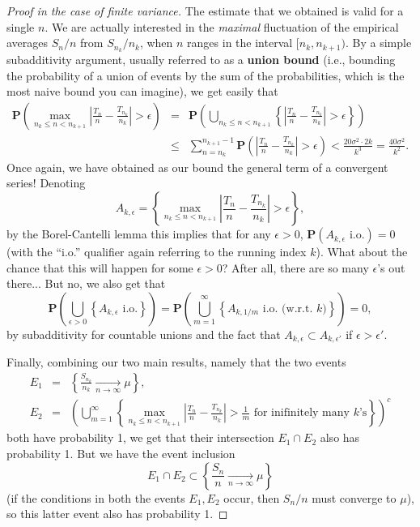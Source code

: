\documentclass[12pt]{article}
\newcommand{\prob}{\mathbf{P}}
\theoremstyle{example}
\begin{document}
\begin{proof}[Proof in the case of finite variance]
 The estimate that we obtained is valid for a single $n$. We are actually interested in the \emph{maximal} fluctuation of the empirical averages $S_n/n$ from $S_{n_k}/n_k$, when $n$ ranges in the interval $[n_k,n_{k+1})$. By a simple subadditivity argument, usually referred to as a \textbf{union bound} (i.e., bounding the probability of a union of events by the sum of the probabilities, which is the most naive bound you can imagine), we get easily that
\begin{eqnarray*}
 \prob\left(\max_{n_k \le n < n_{k+1}} \left| \frac{T_n}{n} - \frac{T_{n_k}}{n_k} \right| > \epsilon \right)
 &=& 
 \prob\left(\bigcup_{n_k \le n < n_{k+1}} \left\{\left| \frac{T_n}{n} - \frac{T_{n_k}}{n_k} \right| > \epsilon \right\}\right)
\\ &\le& \sum_{n=n_k}^{n_{k+1}-1} 
 \prob\left(\left| \frac{T_n}{n} - \frac{T_{n_k}}{n_k} \right| > \epsilon \right) < \frac{20 \sigma^2\cdot 2k}{k^3}
 = \frac{40\sigma^2}{k^2}.
\end{eqnarray*}
Once again, we have obtained as our bound the general term of a convergent series! Denoting
$$ A_{k,\epsilon} = \left\{ \max_{n_k \le n < n_{k+1}} \left| \frac{T_n}{n} - \frac{T_{n_k}}{n_k} \right| > \epsilon 
\right\}, $$
by the Borel-Cantelli lemma this implies that for any $\epsilon>0$, $\prob(A_{k,\epsilon}\textrm{ i.o.})=0$ (with the ``i.o.'' qualifier again referring to the running index $k$). What about the chance that this will happen for some $\epsilon>0$? After all, there are so many $\epsilon$'s out there... But no, we also get that
$$ \prob\left(\bigcup_{\epsilon>0} \left\{ A_{k,\epsilon}\textrm{ i.o.} \right\} \right) = 
\prob\left( \bigcup_{m=1}^\infty \left\{ A_{k,1/m}\textrm{ i.o. (w.r.t.\ $k$)}\right\} \right) = 0,
$$
by subadditivity for countable unions and the fact that $A_{k,\epsilon} \subset A_{k,\epsilon'}$ if $\epsilon>\epsilon'$.

Finally, combining our two main results, namely that the two events
\begin{eqnarray*}
E_1 &=& \left\{ \frac{S_{n_k}}{n_k} \xrightarrow[n\to\infty]{} \mu \right\},
\\
E_2 &=& \left( \bigcup_{m=1}^\infty \left\{ 
\max_{n_k\le n< n_{k+1}} \left|\frac{T_n}{n}-\frac{T_{n_k}}{n_k} \right| > \frac{1}{m} 
\textrm{ for inifinitely many $k$'s}
\right\}
\right)^c
\end{eqnarray*}
both have probability 1, we get that their intersection $E_1\cap E_2$ also has probability 1. But we have the event inclusion
$$ E_1 \cap E_2 \subset \left\{ \frac{S_n}{n} \xrightarrow[n\to\infty]{} \mu \right\} $$
(if the conditions in both the events $E_1, E_2$ occur, then $S_n/n$ must converge to $\mu$), so this latter event also has probability 1.
\end{proof}
\end{document}
